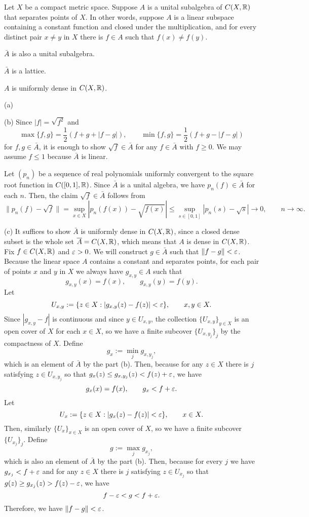 \documentclass{../../large}
\begin{document}
\begin{prb}
Let $X$ be a compact metric space.
Suppose $A$ is a unital subalgebra of $C(X,\mathbb{R})$ that separates points of $X$.
In other words, suppose $A$ is a linear subspace containing a constant function and closed under the multiplication, and for every distinct pair $x\ne y$ in $X$ there is $f\in A$ such that $f(x)\ne f(y)$.


\begin{parts}
\item $\bar A$ is also a unital subalgebra.
\item $\bar A$ is a lattice.
\item $A$ is uniformly dense in $C(X,\mathbb{R})$.
\end{parts}
\end{prb}
\begin{pf}
(a)

(b)
Since $|f|=\sqrt{f^2}$ and
\[\max\{f,g\}=\frac12(f+g+|f-g|),\qquad\min\{f,g\}=\frac12(f+g-|f-g|)\]
for $f,g\in\bar A$, it is enough to show $\sqrt f\in\bar A$ for any $f\in\bar A$ with $f\ge0$.
We may assume $f\le1$ because $\bar A$ is linear.

Let $(p_n)$ be a sequence of real polynomials uniformly convergent to the square root function in $C([0,1],\mathbb{R})$.
Since $\bar A$ is a unital algebra, we have $p_n(f)\in\bar A$ for each $n$.
Then, the claim $\sqrt f\in\bar A$ follows from
\[\|p_n(f)-\sqrt f\|=\sup_{x\in X}|p_n(f(x))-\sqrt{f(x)}|\le\sup_{s\in[0,1]}|p_n(s)-\sqrt s|\to0,\qquad n\to\infty.\]

(c)
It suffices to show $\bar A$ is uniformly dense in $C(X,\mathbb{R})$, since a closed dense subset is the whole set $\overline A=C(X,\mathbb{R})$, which means that $A$ is dense in $C(X,\mathbb{R})$.
Fix $f\in C(X,\mathbb{R})$ and $\varepsilon>0$.
We will construct $g\in\bar A$ such that $\|f-g\|<\varepsilon$.
Because the linear space $A$ contains a constant and separates points, for each pair of points $x$ and $y$ in $X$ we always have $g_{x,y}\in A$ such that
\[g_{x,y}(x)=f(x),\qquad g_{x,y}(y)=f(y).\]
Let
\[U_{x,y}:=\{z\in X:|g_{x,y}(z)-f(z)|<\varepsilon\},\qquad x,y\in X.\]
Since $|g_{x,y}-f|$ is continuous and since $y\in U_{x,y}$, the collection $\{U_{x,y}\}_{y\in X}$ is an open cover of $X$ for each $x\in X$, so we have a finite subcover $\{U_{x,y_j}\}_j$ by the compactness of $X$.
Define
\[g_x:=\min_jg_{x,y_j},\]
which is an element of $\bar A$ by the part (b).
Then, because for any $z\in X$ there is $j$ satisfying $z\in U_{x,y_j}$ so that $g_x(z)\le g_{x,y_j}(z)<f(z)+\varepsilon$, we have
\[g_x(x)=f(x),\qquad g_x<f+\varepsilon.\]
Let
\[U_x:=\{z\in X:|g_x(z)-f(z)|<\varepsilon\},\qquad x\in X.\]
Then, similarly $\{U_x\}_{x\in X}$ is an open cover of $X$, so we have a finite subcover $\{U_{x_j}\}_j$.
Define
\[g:=\max_jg_{x_j},\]
which is also an element of $\bar A$ by the part (b).
Then, because for every $j$ we have $g_{x_j}<f+\varepsilon$ and for any $z\in X$ there is $j$ satisfying $z\in U_{x_j}$ so that $g(z)\ge g_{x_j}(z)>f(z)-\varepsilon$, we have
\[f-\varepsilon<g<f+\varepsilon.\]
Therefore, we have $\|f-g\|<\varepsilon$.
\end{pf}
\end{document}
